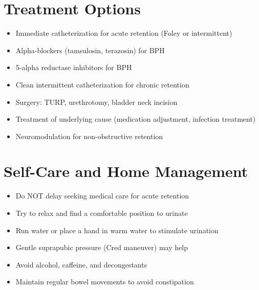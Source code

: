 \section*{Treatment Options}
\begin{itemize}
\item Immediate catheterization for acute retention (Foley or intermittent)
\item Alpha-blockers (tamsulosin, terazosin) for BPH
\item 5-alpha reductase inhibitors for BPH
\item Clean intermittent catheterization for chronic retention
\item Surgery: TURP, urethrotomy, bladder neck incision
\item Treatment of underlying cause (medication adjustment, infection treatment)
\item Neuromodulation for non-obstructive retention
\end{itemize}

\section*{Self-Care and Home Management}
\begin{itemize}
\item Do NOT delay seeking medical care for acute retention
\item Try to relax and find a comfortable position to urinate
\item Run water or place a hand in warm water to stimulate urination
\item Gentle suprapubic pressure (Cred maneuver) may help
\item Avoid alcohol, caffeine, and decongestants
\item Maintain regular bowel movements to avoid constipation
\end{itemize}


